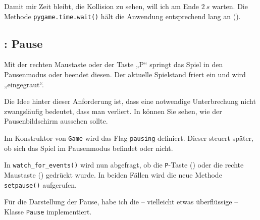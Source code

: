 
Damit mir Zeit bleibt, die Kollision zu sehen, will ich am Ende $2~s$ warten. Die Methode \texttt{pygame.time.wait()} hält die Anwendung entsprechend lang an ().



\subsection{: Pause}
 Mit der rechten Maustaste oder der Taste „P“ springt das Spiel in den Pausenmodus oder beendet diesen. Der aktuelle Spielstand friert ein und wird „eingegraut“. 
\er

Die Idee hinter dieser Anforderung ist, dass eine notwendige Unterbrechung nicht zwangsläufig bedeutet, dass man verliert. In  können Sie sehen, wie der Pausenbildschirm aussehen sollte.


Im Konstruktor von \texttt{Game} wird das Flag \texttt{pausing} definiert. Dieser steuert später, ob sich das Spiel im Pausenmodus befindet oder nicht.


In \texttt{watch\_for\_events()} wird nun abgefragt, ob die \texttt{P}-Taste () oder die rechte Maustaste () gedrückt wurde. In beiden Fällen wird die neue Methode \texttt{setpause()} aufgerufen. 



Für die Darstellung der Pause, habe ich die -- vielleicht etwas überflüssige -- Klasse \texttt{Pause} implementiert. 

